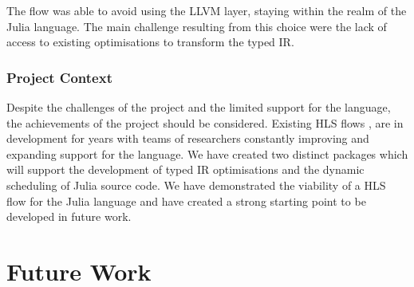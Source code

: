 The flow was able to avoid using the LLVM layer, staying within the realm of the Julia language. The main challenge resulting from this choice were the lack of access to existing optimisations to transform the typed IR. 

\subsubsection{Project Context}
Despite the challenges of the project and the limited support for the language, the achievements of the project should be considered. Existing HLS flows \cite{legup_intro}, \cite{dynamatics_p} are in development for years with teams of researchers constantly improving and expanding support for the language. We have created two distinct packages which will support the development of typed IR optimisations and the dynamic scheduling of Julia source code. We have demonstrated the viability of a HLS flow for the Julia language and have created a strong starting point to be developed in future work.

\iffalse
what were the objectives, were they achieved?
justify the resource size based on the IRs as input
explain lack of matrix vector multiply?
be persuasive about the skeleton framework introduced
	created a solid modular framework
	existing hls flows take significant time to develop
	
evaluate lack of frequency determination and buffers - combinatorial logic vs latency

critical evaluation of the work - compared to previous work, analysis, algos etc
relate to objectives
	how have objectives been fulfilled/not - how they have changed
advantages and disadvantages of the approach chosen - compared to related work
How does the scope differ from related work? - might be a good idea to compare IR to llvm, issues 
evidence of critical reflections - compare outcomes with objectives
	any changes between iterim and final should be explained self contained
	ref and summarise requirements
\fi

\iffalse
how successful, whats been achieved
identify what was worthwhile but be honest about limits of the work
describe the stuff not completed as further work
summarise and refer to other sections
	design choices and why
	difficult/clever part of the project
	why difficult, how overcome
	what was learnt
\fi

\section{Future Work}

